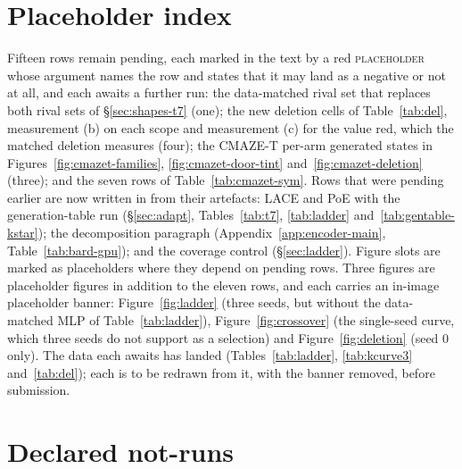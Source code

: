 \documentclass{article} %
\begin{document}
\section{Placeholder index}
\label{app:placeholders}

Fifteen rows remain pending, each marked in the text by a red \textsc{placeholder} whose argument names
the row and states that it may land as a negative or not at all, and each awaits a further run: the
data-matched rival set that replaces both rival sets of \S\ref{sec:shapes-t7} (one); the new
deletion cells of Table~\ref{tab:del}, measurement (b) on each scope and measurement (c) for the
value red, which the matched deletion measures (four); the
CMAZE-T per-arm generated states in Figures~\ref{fig:cmazet-families}, \ref{fig:cmazet-door-tint}
and~\ref{fig:cmazet-deletion} (three); and the seven rows of Table~\ref{tab:cmazet-sym}. Rows
that were pending earlier are now written in from their artefacts: LACE and PoE with the generation-table run
(\S\ref{sec:adapt}, Tables~\ref{tab:t7}, \ref{tab:ladder} and~\ref{tab:gentable-kstar});
the decomposition paragraph (Appendix~\ref{app:encoder-main}, Table~\ref{tab:bard-gpu}); and the
coverage control
(\S\ref{sec:ladder}). Figure slots are marked as placeholders where they depend on pending rows.
Three figures are placeholder figures in addition to the eleven rows, and each carries an in-image
placeholder banner: Figure~\ref{fig:ladder} (three seeds, but without the data-matched MLP of
Table~\ref{tab:ladder}), Figure~\ref{fig:crossover} (the single-seed curve, which three seeds do not
support as a selection) and Figure~\ref{fig:deletion} (seed 0 only). The data each awaits has
landed (Tables~\ref{tab:ladder}, \ref{tab:kcurve3} and~\ref{tab:del}); each is to be redrawn from
it, with the banner removed, before submission.

\section{Declared not-runs}
\label{app:notrun}
\end{document}
